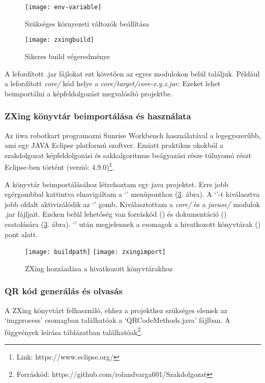 \documentclass[../documentation.tex]{subfiles}
\begin{document}
\begin{figure}[h]
\centering
\texttt{[image: env-variable]}
\caption{Szükséges környezeti változók beállítása}
\label{fig:envvar}
\end{figure}

\begin{figure}[h]
\centering
\texttt{[image: zxingbuild]}
\caption{Sikeres build végeredménye}
\label{fig:buildsuccess}
\end{figure}

A lefordított .jar fájlokat ezt követően az egyes modulokon belül találjuk. Például a lefordított \textit{core/} kód helye a \textit{core/target/core-x.y.z.jar}. Ezeket lehet beimportálni a képfeldolgozást megvalósító projektbe.

\subsubsection{ZXing könyvtár beimportálása és használata}
Az iiwa robotkart programozni Sunrise Workbench használatával a legegyszerűbb, ami egy JAVA Eclipse platformú szoftver. Emiatt praktikus okokból a szakdolgozat képfeldolgozási és sakkalgoritmus beágyazási része túlnyomó részt Eclipse-ben történt (verzió: 4.9.0)\footnote{Link: https://www.eclipse.org/}.

A könyvtár beimportálásához létrehoztam egy java projektet. Erre jobb egérgombbal kattintva elnavigáltam a `' menüponthoz (\ref{fig:zxingimport}. ábra). A `'-t kiválasztva jobb oldalt aktivizálódik az `' gomb. Kiválasztottam a \textit{core/} és a \textit{javase/} modulok .jar fájljait. Ezeken belül lehetőség van forráskód () és dokumentáció () csatolására (\ref{fig:zxingimport}. ábra). `' után megjelennek a csomagok a hivatkozott könyvtárak () pont alatt.

\begin{figure}[h]
\centering
\texttt{[image: buildpath]}
\texttt{[image: zxingimport]}
\caption{ZXing hozzáadása a hivatkozott könyvtárakhoz}
\label{fig:zxingimport}
\end{figure}

\subsubsection{QR kód generálás és olvasás}
A ZXing könyvtárt felhasználó, ehhez a projekthez szükséges elemek az `imgprocess' csomagban találhatóak a `QRCodeMethods.java' fájlban. A függvények leírása   táblázatban találhatóak\footnote{Forráskód: https://github.com/rolandvarga601/Szakdolgozat}. 
\end{document}
